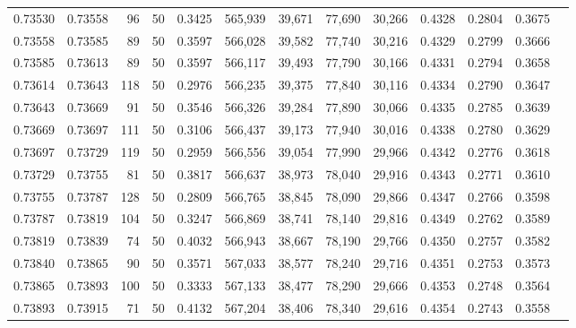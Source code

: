 \begin{tabular}{rrrrrrrrrrrrr}
0.73530 & 0.73558 &    96 &  50 &                                     0.3425 & 565,939 &  39,671 &  77,690 &  30,266 & 0.4328 & 0.2804 & 0.3675 \\
0.73558 & 0.73585 &    89 &  50 &                                     0.3597 & 566,028 &  39,582 &  77,740 &  30,216 & 0.4329 & 0.2799 & 0.3666 \\
0.73585 & 0.73613 &    89 &  50 &                                     0.3597 & 566,117 &  39,493 &  77,790 &  30,166 & 0.4331 & 0.2794 & 0.3658 \\
0.73614 & 0.73643 &   118 &  50 &                                     0.2976 & 566,235 &  39,375 &  77,840 &  30,116 & 0.4334 & 0.2790 & 0.3647 \\
0.73643 & 0.73669 &    91 &  50 &                                     0.3546 & 566,326 &  39,284 &  77,890 &  30,066 & 0.4335 & 0.2785 & 0.3639 \\
0.73669 & 0.73697 &   111 &  50 &                                     0.3106 & 566,437 &  39,173 &  77,940 &  30,016 & 0.4338 & 0.2780 & 0.3629 \\
0.73697 & 0.73729 &   119 &  50 &                                     0.2959 & 566,556 &  39,054 &  77,990 &  29,966 & 0.4342 & 0.2776 & 0.3618 \\
0.73729 & 0.73755 &    81 &  50 &                                     0.3817 & 566,637 &  38,973 &  78,040 &  29,916 & 0.4343 & 0.2771 & 0.3610 \\
0.73755 & 0.73787 &   128 &  50 &                                     0.2809 & 566,765 &  38,845 &  78,090 &  29,866 & 0.4347 & 0.2766 & 0.3598 \\
0.73787 & 0.73819 &   104 &  50 &                                     0.3247 & 566,869 &  38,741 &  78,140 &  29,816 & 0.4349 & 0.2762 & 0.3589 \\
0.73819 & 0.73839 &    74 &  50 &                                     0.4032 & 566,943 &  38,667 &  78,190 &  29,766 & 0.4350 & 0.2757 & 0.3582 \\
0.73840 & 0.73865 &    90 &  50 &                                     0.3571 & 567,033 &  38,577 &  78,240 &  29,716 & 0.4351 & 0.2753 & 0.3573 \\
0.73865 & 0.73893 &   100 &  50 &                                     0.3333 & 567,133 &  38,477 &  78,290 &  29,666 & 0.4353 & 0.2748 & 0.3564 \\
0.73893 & 0.73915 &    71 &  50 &                                     0.4132 & 567,204 &  38,406 &  78,340 &  29,616 & 0.4354 & 0.2743 & 0.3558 \\

\end{tabular}
